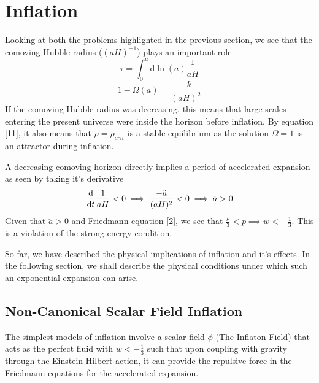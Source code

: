 \documentclass[aps,prd,reprint,preprintnumbers,showpacs,floatfix,nofootinbib,superscript address]{revtex4-2}
\begin{document}
\section{Inflation}\label{Inflation}
Looking at both the problems highlighted in the previous section, we see that the comoving Hubble radius ($(aH)^{-1}$) plays an important role
\begin{equation}    \label{10}
    \tau = \int_{0}^{a} \mathrm{d} \ln (a) \frac{1}{aH}
\end{equation}
\begin{equation} \label{11}
    1 - \Omega (a) = \frac{-k}{(aH)^2}
\end{equation}
If the comoving Hubble radius was decreasing, this means that large scales entering the present universe were inside the horizon before inflation. By equation \ref{11}, it also means that $\rho = \rho_{crit}$ is a stable equilibrium as the solution $\Omega = 1$ is an attractor during inflation.

A decreasing comoving horizon directly implies a period of accelerated expansion as seen by taking it's derivative
\begin{equation}
    \frac{\mathrm{d}}{\mathrm{d}t} \frac{1}{aH} <  0 \implies \frac{-\Ddot{a}}{(aH)^2} < 0 \implies \ddot{a} > 0
\end{equation}
Given that $\ddot{a} > 0$ and Friedmann equation \ref{2}, we see that $\frac{\rho}{3} < p \implies w < - \frac{1}{3}$. This is a violation of the strong energy condition.

So far, we have described the physical implications of inflation and it's effects. In the following section, we shall describe the physical conditions under which such an exponential expansion can arise. 

\subsection{Non-Canonical Scalar Field Inflation} \label{Non-Canonical Scalar Field Inflation}
The simplest models of inflation involve a scalar field $\phi$ (The Inflaton Field) that acts as the perfect fluid with $w < -\frac{1}{3}$ such that upon coupling with gravity through the Einstein-Hilbert action, it can provide the repulsive force in the Friedmann equations for the accelerated expansion.
\end{document}
